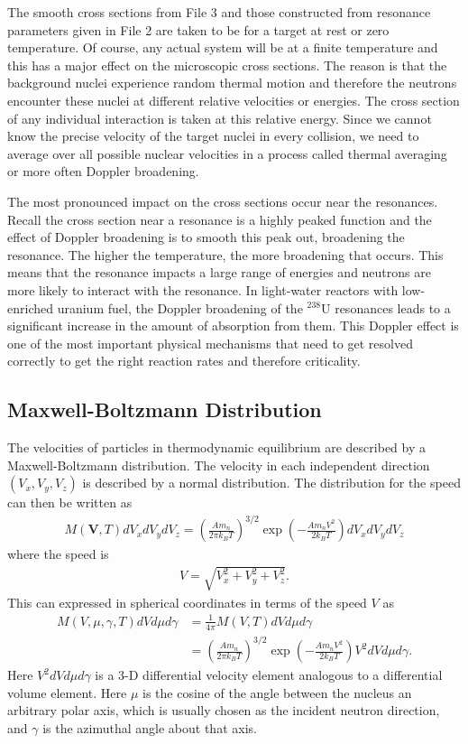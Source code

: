 The smooth cross sections from File 3 and those constructed from resonance parameters given in File 2 are taken to be for a target at rest or zero temperature. Of course, any actual system will be at a finite temperature and this has a major effect on the microscopic cross sections. The reason is that the background nuclei experience random thermal motion and therefore the neutrons encounter these nuclei at different relative velocities or energies. The cross section of any individual interaction is taken at this relative energy. Since we cannot know the precise velocity of the target nuclei in every collision, we need to average over all possible nuclear velocities in a process called thermal averaging or more often Doppler broadening.

The most pronounced impact on the cross sections occur near the resonances. Recall the cross section near a resonance is a highly peaked function and the effect of Doppler broadening is to smooth this peak out, broadening the resonance. The higher the temperature, the more broadening that occurs. This means that the resonance impacts a large range of energies and neutrons are more likely to interact with the resonance. In light-water reactors with low-enriched uranium fuel, the Doppler broadening of the $^{238}$U resonances leads to a significant increase in the amount of absorption from them. This Doppler effect is one of the most important physical mechanisms that need to get resolved correctly to get the right reaction rates and therefore criticality.

\subsection{Maxwell-Boltzmann Distribution}

The velocities of particles in thermodynamic equilibrium are described by a Maxwell-Boltzmann distribution. The velocity in each independent direction $(V_x,V_y,V_z)$ is described by a normal distribution. The distribution for the speed can then be written as
\begin{align}
  M(\mathbf{V},T) dV_x dV_y dV_z 
  = \left( \frac{ A m_n }{ 2 \pi k_B T } \right)^{3/2} \exp \left( -\frac{ A m_n V^2 }{ 2 k_B T } \right) dV_x dV_y dV_z
\end{align}
where the speed is
\begin{align}
  V = \sqrt{ V_x^2 + V_y^2 + V_z^2 } .
\end{align}
This can expressed in spherical coordinates in terms of the speed $V$ as
\begin{align}
  M(V,\mu,\gamma,T) dV d\mu d\gamma &= \frac{1}{4\pi} M(V,T) dV d\mu d\gamma \nonumber \\
  &= \left( \frac{Am_n}{2\pi k_B T} \right)^{3/2} \exp \left( -\frac{ A m_n V^2 }{ 2 k_B T } \right) V^2 dV d\mu d\gamma.
\end{align}
Here $V^2 dV d\mu d\gamma$ is a 3-D differential velocity element analogous to a differential volume element. Here $\mu$ is the cosine of the angle between the nucleus an arbitrary polar axis, which is usually chosen as the incident neutron direction, and $\gamma$ is the azimuthal angle about that axis.

